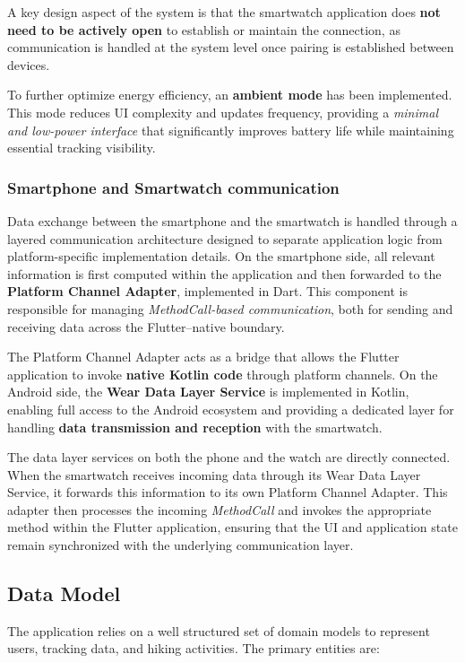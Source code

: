 \documentclass[12pt]{article}
\begin{document}
        A key design aspect of the system is that the smartwatch application does \textbf{not need to be actively open} to establish or maintain the connection, as communication is handled at the system level once pairing is established between devices.

        To further optimize energy efficiency, an \textbf{ambient mode} has been implemented. This mode reduces UI complexity and updates frequency, providing a \textit{minimal and low-power interface} that significantly improves battery life while maintaining essential tracking visibility.
            
    \subsubsection{Smartphone and Smartwatch communication}
        Data exchange between the smartphone and the smartwatch is handled through a layered communication architecture designed to separate application logic from platform-specific implementation details. On the smartphone side, all relevant information is first computed within the application and then forwarded to the \textbf{Platform Channel Adapter}, implemented in Dart. This component is responsible for managing \textit{MethodCall-based communication}, both for sending and receiving data across the Flutter--native boundary.

        The Platform Channel Adapter acts as a bridge that allows the Flutter application to invoke \textbf{native Kotlin code} through platform channels. On the Android side, the \textbf{Wear Data Layer Service} is implemented in Kotlin, enabling full access to the Android ecosystem and providing a dedicated layer for handling \textbf{data transmission and reception} with the smartwatch.

        The data layer services on both the phone and the watch are directly connected. When the smartwatch receives incoming data through its Wear Data Layer Service, it forwards this information to its own Platform Channel Adapter. This adapter then processes the incoming \textit{MethodCall} and invokes the appropriate method within the Flutter application, ensuring that the UI and application state remain synchronized with the underlying communication layer.

\subsection{Data Model}
The application relies on a well structured set of domain models to represent users, tracking data, and hiking activities. The primary entities are:
\end{document}
